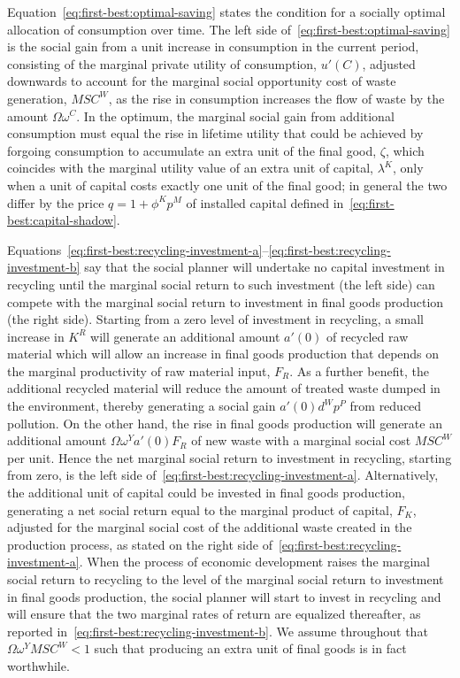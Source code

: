 Equation~\eqref{eq:first-best:optimal-saving} states the condition for a socially optimal allocation of consumption over time. The left side of~\eqref{eq:first-best:optimal-saving} is the social gain from a unit increase in consumption in the current period, consisting of the marginal private utility of consumption, $u'(C)$, adjusted downwards to account for the marginal social opportunity cost of waste generation, $MSC^W$, as the rise in consumption increases the flow of waste by the amount $\Omega\omega^C$. In the optimum, the marginal social gain from additional consumption must equal the rise in lifetime utility that could be achieved by forgoing consumption to accumulate an extra unit of the final good, $\zeta$, which coincides with the marginal utility value of an extra unit of capital, $\lambda^K$, only when a unit of capital costs exactly one unit of the final good; in general the two differ by the price $q=1+\phi^Kp^M$ of installed capital defined in~\eqref{eq:first-best:capital-shadow}.

Equations~\eqref{eq:first-best:recycling-investment-a}--\eqref{eq:first-best:recycling-investment-b} say that the social planner will undertake no capital investment in recycling until the marginal social return to such investment (the left side) can compete with the marginal social return to investment in final goods production (the right side). Starting from a zero level of investment in recycling, a small increase in $K^R$ will generate an additional amount $a'(0)$ of recycled raw material which will allow an increase in final goods production that depends on the marginal productivity of raw material input, $F_R$. As a further benefit, the additional recycled material will reduce the amount of treated waste dumped in the environment, thereby generating a social gain $a'(0)d^W p^P$ from reduced pollution. On the other hand, the rise in final goods production will generate an additional amount $\Omega\omega^Y a'(0)F_R$ of new waste with a marginal social cost $MSC^W$ per unit. Hence the net marginal social return to investment in recycling, starting from zero, is the left side of~\eqref{eq:first-best:recycling-investment-a}. Alternatively, the additional unit of capital could be invested in final goods production, generating a net social return equal to the marginal product of capital, $F_K$, adjusted for the marginal social cost of the additional waste created in the production process, as stated on the right side of~\eqref{eq:first-best:recycling-investment-a}. When the process of economic development raises the marginal social return to recycling to the level of the marginal social return to investment in final goods production, the social planner will start to invest in recycling and will ensure that the two marginal rates of return are equalized thereafter, as reported in~\eqref{eq:first-best:recycling-investment-b}. We assume throughout that $\Omega\omega^Y MSC^W < 1$ such that producing an extra unit of final goods is in fact worthwhile.

